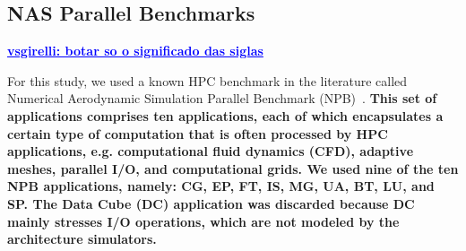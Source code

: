 \documentclass[AMA,final,STIX1COL]{WileyNJD-v2}
\newcommand\new[1]{{\color{red}\textbf{#1}}}
\newcommand{\vsg}[1]{\textcolor{blue}{\bfseries \ul{vsgirelli: #1} }\vspace{0.2cm}}
\begin{document}
\begin{table}[]
    \centering
    \footnotesize
    \caption{Prefetcher algorithms.}
    \label{prefetches}
\end{table}

 

\subsection{NAS Parallel Benchmarks}
\label{subsec:nas}

\vsg{botar so o significado das siglas}

For this study, we used a known HPC benchmark in the literature called Numerical Aerodynamic Simulation Parallel Benchmark (NPB)~\cite{jin1999openmp}. 
\new{This set of applications comprises ten applications, each of which encapsulates a certain type of computation that is often processed by HPC applications, e.g. computational fluid dynamics (CFD), adaptive meshes, parallel I/O, and computational grids.
We used nine of the ten NPB applications, namely: CG, EP, FT, IS, MG, UA, BT, LU, and SP.
The Data Cube (DC) application was discarded because DC mainly stresses I/O operations, which are not modeled by the architecture simulators.}
\end{document}

